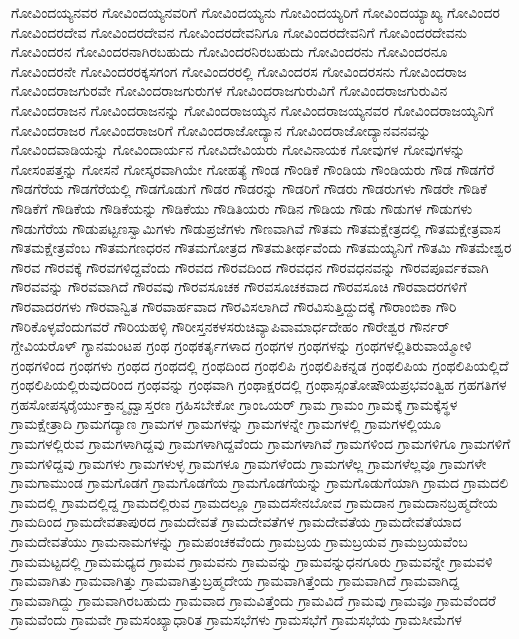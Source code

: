 {ಗೋವಿಂದಯ್ಯನವರ
ಗೋವಿಂದಯ್ಯನವರಿಗೆ
ಗೋವಿಂದಯ್ಯನು
ಗೋವಿಂದಯ್ಯರಿಗೆ
ಗೋವಿಂದಯ್ಯಾಖ್ಯ
ಗೋವಿಂದರ
ಗೋವಿಂದರದೇವ
ಗೋವಿಂದರದೇವನ
ಗೋವಿಂದರದೇವನಿಗೂ
ಗೋವಿಂದರದೇವನಿಗೆ
ಗೋವಿಂದರದೇವನು
ಗೋವಿಂದರನ
ಗೋವಿಂದರನಾಗಿರಬಹುದು
ಗೋವಿಂದರನಿರಬಹುದು
ಗೋವಿಂದರನು
ಗೋವಿಂದರನೂ
ಗೋವಿಂದರನೇ
ಗೋವಿಂದರರಕ್ಕಸಗಂಗ
ಗೋವಿಂದರರಲ್ಲಿ
ಗೋವಿಂದರಸ
ಗೋವಿಂದರಸನು
ಗೋವಿಂದರಾಜ
ಗೋವಿಂದರಾಜಗುರವೇ
ಗೋವಿಂದರಾಜಗುರುಗಳ
ಗೋವಿಂದರಾಜಗುರುವಿಗೆ
ಗೋವಿಂದರಾಜಗುರುವಿನ
ಗೋವಿಂದರಾಜನ
ಗೋವಿಂದರಾಜನನ್ನು
ಗೋವಿಂದರಾಜಯ್ಯನ
ಗೋವಿಂದರಾಜಯ್ಯನವರ
ಗೋವಿಂದರಾಜಯ್ಯನಿಗೆ
ಗೋವಿಂದರಾಜರ
ಗೋವಿಂದರಾಜರಿಗೆ
ಗೋವಿಂದರಾಜೋದ್ಯಾನ
ಗೋವಿಂದರಾಜೋದ್ಯಾನವನವನ್ನು
ಗೋವಿಂದವಾಡಿಯನ್ನು
ಗೋವಿಂದಾರ್ಯನ
ಗೋವಿದೇವಿಯರು
ಗೋವಿನಾಯಕ
ಗೋವುಗಳ
ಗೋವುಗಳನ್ನು
ಗೋಸಂಪತ್ತನ್ನು
ಗೋಸನೆ
ಗೋಸ್ಕರವಾಗಿಯೇ
ಗೋಹತ್ಯೆ
ಗೌಂಡ
ಗೌಂಡಿಕೆ
ಗೌಂಡಿಯ
ಗೌಂಡಿಯರು
ಗೌಡ
ಗೌಡಗೆರೆ
ಗೌಡಗೆರೆಯ
ಗೌಡಗೆರೆಯಲ್ಲಿ
ಗೌಡಗೊಡುಗೆ
ಗೌಡರ
ಗೌಡರನ್ನು
ಗೌಡರಿಗೆ
ಗೌಡರು
ಗೌಡರುಗಳು
ಗೌಡರೇ
ಗೌಡಿಕೆ
ಗೌಡಿಕೆಗೆ
ಗೌಡಿಕೆಯ
ಗೌಡಿಕೆಯನ್ನು
ಗೌಡಿಕೆಯು
ಗೌಡಿತಿಯರು
ಗೌಡಿನ
ಗೌಡಿಯ
ಗೌಡು
ಗೌಡುಗಳ
ಗೌಡುಗಳು
ಗೌಡುಗೆರೆಯ
ಗೌಡುಪಟ್ಟಣಸ್ವಾಮಿಗಳು
ಗೌಡುಪ್ರಜೆಗಳು
ಗೌಣವಾಗಿವೆ
ಗೌತಮ
ಗೌತಮಕ್ಷೇತ್ರದಲ್ಲಿ
ಗೌತಮಕ್ಷೇತ್ರವಾಸ
ಗೌತಮಕ್ಷೇತ್ರವೆಂಬ
ಗೌತಮಗಣಧರನ
ಗೌತಮಗೋತ್ರದ
ಗೌತಮತೀರ್ಥವೆಂದು
ಗೌತಮಯ್ಯನಿಗೆ
ಗೌತಮಿ
ಗೌತಮೇಶ್ವರ
ಗೌರವ
ಗೌರವಕ್ಕೆ
ಗೌರವಗಳಿದ್ದವೆಂದು
ಗೌರವದ
ಗೌರವದಿಂದ
ಗೌರವಧನ
ಗೌರವಧನವನ್ನು
ಗೌರವಪೂರ್ವಕವಾಗಿ
ಗೌರವವನ್ನು
ಗೌರವವಾಗಿದೆ
ಗೌರವವು
ಗೌರವಸೂಚಕ
ಗೌರವಸೂಚಕವಾದ
ಗೌರವಸೂಚಿ
ಗೌರವಾದರಗಳಿಗೆ
ಗೌರವಾದರಗಳು
ಗೌರವಾನ್ವಿತ
ಗೌರವಾರ್ಹವಾದ
ಗೌರವಿಸಲಾಗಿದೆ
ಗೌರವಿಸುತ್ತಿದ್ದುದಕ್ಕೆ
ಗೌರಾಂಬಿಕಾ
ಗೌರಿ
ಗೌರಿಕೊಳ್ಳವೆಂದುಗವರೆ
ಗೌರಿಯಹಳ್ಳಿ
ಗೌರೀಸ್ತನಕಳಸರುಚಿವ್ಯಾಪಿವಾಮಾರ್ಧದೇಹಂ
ಗೌರೇಶ್ವರ
ಗೌರ್ನರ್
ಗ್ದೇವಿಯರೊಳ್
ಗ್ಯಾನಮಂಟಪ
ಗ್ರಂಥ
ಗ್ರಂಥಕರ್ತೃಗಳಾದ
ಗ್ರಂಥಗಳ
ಗ್ರಂಥಗಳನ್ನು
ಗ್ರಂಥಗಳಲ್ಲಿತಿರುವಾಯ್ಮೋಳಿ
ಗ್ರಂಥಗಳಿಂದ
ಗ್ರಂಥಗಳು
ಗ್ರಂಥದ
ಗ್ರಂಥದಲ್ಲಿ
ಗ್ರಂಥದಿಂದ
ಗ್ರಂಥಲಿಪಿ
ಗ್ರಂಥಲಿಪಿಕನ್ನಡ
ಗ್ರಂಥಲಿಪಿಯ
ಗ್ರಂಥಲಿಪಿಯಲ್ಲಿದೆ
ಗ್ರಂಥಲಿಪಿಯಲ್ಲಿರುವುದರಿಂದ
ಗ್ರಂಥವನ್ನು
ಗ್ರಂಥವಾಗಿ
ಗ್ರಂಥಾಕ್ಷರದಲ್ಲಿ
ಗ್ರಂಥಾಸ್ಸಂತೋಷೌಯಪ್ರಭವಂತ್ವಿಹ
ಗ್ರಹಗತಿಗಳ
ಗ್ರಹಸೋಪಸ್ಕರೈರ್ಯುಕ್ತಾನ್ಮೃದ್ವಾಸ್ತರಣ
ಗ್ರಹಿಸಬೇಕೋ
ಗ್ರಾಂಒಯರ್
ಗ್ರಾಮ
ಗ್ರಾಮಂ
ಗ್ರಾಮಕ್ಕೆ
ಗ್ರಾಮಕ್ಕೆಸ್ಥಳ
ಗ್ರಾಮಕ್ಷೇತ್ರಾದಿ
ಗ್ರಾಮಗದ್ಯಾಣ
ಗ್ರಾಮಗಳ
ಗ್ರಾಮಗಳನ್ನು
ಗ್ರಾಮಗಳನ್ನೇ
ಗ್ರಾಮಗಳಲ್ಲಿ
ಗ್ರಾಮಗಳಲ್ಲಿಯೂ
ಗ್ರಾಮಗಳಲ್ಲಿರುವ
ಗ್ರಾಮಗಳಾಗಿದ್ದವು
ಗ್ರಾಮಗಳಾಗಿದ್ದವೆಂದು
ಗ್ರಾಮಗಳಾಗಿವೆ
ಗ್ರಾಮಗಳಿಂದ
ಗ್ರಾಮಗಳಿಗೂ
ಗ್ರಾಮಗಳಿಗೆ
ಗ್ರಾಮಗಳಿದ್ದವು
ಗ್ರಾಮಗಳು
ಗ್ರಾಮಗಳುಳ್ಳ
ಗ್ರಾಮಗಳೂ
ಗ್ರಾಮಗಳೆಂದು
ಗ್ರಾಮಗಳೆಲ್ಲ
ಗ್ರಾಮಗಳೆಲ್ಲವೂ
ಗ್ರಾಮಗಳೇ
ಗ್ರಾಮಗಾಮುಂಡ
ಗ್ರಾಮಗೊಡಗೆ
ಗ್ರಾಮಗೊಡಗೆಯ
ಗ್ರಾಮಗೊಡಗೆಯನ್ನು
ಗ್ರಾಮಗೊಡುಗೆಯಾಗಿ
ಗ್ರಾಮದ
ಗ್ರಾಮದಲಿ
ಗ್ರಾಮದಲ್ಲಿ
ಗ್ರಾಮದಲ್ಲಿದ್ದ
ಗ್ರಾಮದಲ್ಲಿರುವ
ಗ್ರಾಮದಲ್ಲೂ
ಗ್ರಾಮದಸೇನಬೋವ
ಗ್ರಾಮದಾನ
ಗ್ರಾಮದಾನಬ್ರಹ್ಮದೇಯ
ಗ್ರಾಮದಿಂದ
ಗ್ರಾಮದೇವತಾಪುರದ
ಗ್ರಾಮದೇವತೆ
ಗ್ರಾಮದೇವತೆಗಳ
ಗ್ರಾಮದೇವತೆಯ
ಗ್ರಾಮದೇವತೆಯಾದ
ಗ್ರಾಮದೇವತೆಯು
ಗ್ರಾಮನಾಮಗಳನ್ನು
ಗ್ರಾಮಪಂಚಕವೆಂದು
ಗ್ರಾಮಬ್ರಯ
ಗ್ರಾಮಬ್ರಯವ
ಗ್ರಾಮಬ್ರಯವೆಂಬ
ಗ್ರಾಮಮಟ್ಟದಲ್ಲಿ
ಗ್ರಾಮಮಧ್ಯದ
ಗ್ರಾಮವ
ಗ್ರಾಮವನು
ಗ್ರಾಮವನ್ನು
ಗ್ರಾಮವನ್ನುಧನಗೂರು
ಗ್ರಾಮವನ್ನೇ
ಗ್ರಾಮವಳಿ
ಗ್ರಾಮವಾಗಿತು
ಗ್ರಾಮವಾಗಿತ್ತು
ಗ್ರಾಮವಾಗಿತ್ತುಬ್ರಹ್ಮದೇಯ
ಗ್ರಾಮವಾಗಿತ್ತೆಂದು
ಗ್ರಾಮವಾಗಿದೆ
ಗ್ರಾಮವಾಗಿದ್ದ
ಗ್ರಾಮವಾಗಿದ್ದು
ಗ್ರಾಮವಾಗಿರಬಹುದು
ಗ್ರಾಮವಾದ
ಗ್ರಾಮವಿತ್ತೆಂದು
ಗ್ರಾಮವಿದೆ
ಗ್ರಾಮವು
ಗ್ರಾಮವೂ
ಗ್ರಾಮವೆಂದರೆ
ಗ್ರಾಮವೆಂದು
ಗ್ರಾಮವೇ
ಗ್ರಾಮಸಂಖ್ಯಾಧಾರಿತ
ಗ್ರಾಮಸಭೆಗಳು
ಗ್ರಾಮಸಭೆಗೆ
ಗ್ರಾಮಸಭೆಯ
ಗ್ರಾಮಸೀಮೆಗಳ
}
